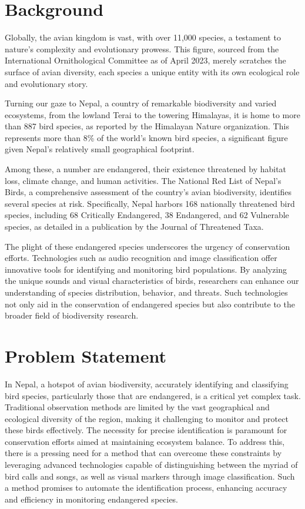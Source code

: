 \section{Background}\label{sec:bkgrnd}%
Globally, the avian kingdom is vast, with over 11,000 species, a testament to nature's complexity 
and evolutionary prowess. This figure, sourced from the International Ornithological Committee as 
of April 2023, merely scratches the surface of avian diversity, each species a unique entity with 
its own ecological role and evolutionary story.\cite{ioc_updates}

Turning our gaze to Nepal, a country of remarkable biodiversity and varied
ecosystems, from the lowland Terai to the towering Himalayas, it is home to
more than 887 bird species, as reported by the Himalayan Nature organization.
This represents more than 8\% of the world's known bird species, a significant
figure given Nepal's relatively small geographical footprint.\cite{himalayan}

Among these, a number are endangered, their existence threatened by habitat
loss, climate change, and human activities. The National Red List of Nepal's
Birds, a comprehensive assessment of the country's avian biodiversity,
identifies several species at risk. Specifically, Nepal harbors 168 nationally
threatened bird species, including 68 Critically Endangered, 38 Endangered, and
62 Vulnerable species, as detailed in a publication by the Journal of
Threatened Taxa.\cite{inskipp2017nepala}

The plight of these endangered species underscores the urgency of conservation
efforts. Technologies such as audio recognition and image classification offer
innovative tools for identifying and monitoring bird populations. By analyzing
the unique sounds and visual characteristics of birds, researchers can enhance
our understanding of species distribution, behavior, and threats. Such
technologies not only aid in the conservation of endangered species but also
contribute to the broader field of biodiversity research.

\section{Problem Statement}
In Nepal, a hotspot of avian biodiversity, accurately identifying and
classifying bird species, particularly those that are endangered, is a critical
yet complex task. Traditional observation methods are limited by the vast
geographical and ecological diversity of the region, making it challenging to
monitor and protect these birds effectively. The necessity for precise
identification is paramount for conservation efforts aimed at maintaining
ecosystem balance. To address this, there is a pressing need for a method that
can overcome these constraints by leveraging advanced technologies capable of
distinguishing between the myriad of bird calls and songs, as well as visual
markers through image classification. Such a method promises to automate the
identification process, enhancing accuracy and efficiency in monitoring
endangered species.

